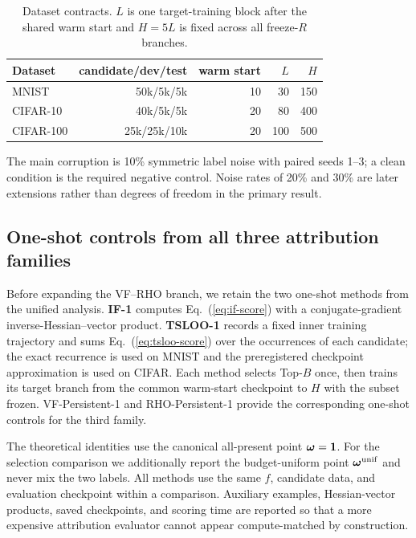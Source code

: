 \begin{table}[h]
\centering
\caption{Dataset contracts. $L$ is one target-training block after the shared
warm start and $H=5L$ is fixed across all freeze-$R$ branches.}
\label{tab:datasets}
\small
\begin{tabular}{lrrrr}
\toprule
Dataset & candidate/dev/test & warm start & $L$ & $H$ \\
\midrule
MNIST & 50k/5k/5k & 10 & 30 & 150 \\
CIFAR-10 & 40k/5k/5k & 20 & 80 & 400 \\
CIFAR-100 & 25k/25k/10k & 20 & 100 & 500 \\
\bottomrule
\end{tabular}
\end{table}

The main corruption is 10\% symmetric label noise with paired seeds 1--3; a
clean condition is the required negative control. Noise rates of 20\% and 30\%
are later extensions rather than degrees of freedom in the primary result.

\subsection{One-shot controls from all three attribution families}

Before expanding the VF--RHO branch, we retain the two one-shot methods from
the unified analysis. \textbf{IF-1} computes Eq.~(\ref{eq:if-score}) with a
conjugate-gradient inverse-Hessian--vector product. \textbf{TSLOO-1} records a
fixed inner training trajectory and sums Eq.~(\ref{eq:tsloo-score}) over the
occurrences of each candidate; the exact recurrence is used on MNIST and the
preregistered checkpoint approximation is used on CIFAR. Each method selects
Top-$B$ once, then trains its target branch from the common warm-start
checkpoint to $H$ with the subset frozen. VF-Persistent-1 and RHO-Persistent-1
provide the corresponding one-shot controls for the third family.

The theoretical identities use the canonical all-present point
${\bm{\omega}}=\bm{1}$. For the selection comparison we additionally report the
budget-uniform point ${\bm{\omega}}^{\mathrm{unif}}$ and never mix the two labels.
All methods use the same $f$, candidate data, and evaluation checkpoint within
a comparison. Auxiliary examples, Hessian-vector products, saved checkpoints,
and scoring time are reported so that a more expensive attribution evaluator
cannot appear compute-matched by construction.

